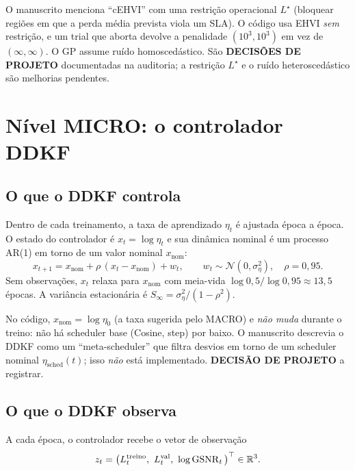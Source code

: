 \begin{observacao}
O manuscrito menciona ``cEHVI'' com uma restrição operacional $L^\star$ (bloquear regiões em que a perda média prevista viola um SLA). O código usa EHVI \emph{sem} restrição, e um trial que aborta devolve a penalidade $(10^3,10^3)$ em vez de $(\infty,\infty)$. O GP assume ruído homoscedástico. São \textbf{DECISÕES DE PROJETO} documentadas na auditoria; a restrição $L^\star$ e o ruído heteroscedástico são melhorias pendentes.
\end{observacao}

\section{Nível MICRO: o controlador DDKF}\label{sec:ddkf}

\subsection{O que o DDKF controla}
Dentro de cada treinamento, a taxa de aprendizado $\eta_t$ é ajustada época a época. O estado do controlador é $x_t=\log\eta_t$ e sua dinâmica nominal é um processo AR(1) em torno de um valor nominal $x_{\text{nom}}$:
\begin{equation}\label{eq:ar1}
x_{t+1}=x_{\text{nom}}+\rho\,(x_t-x_{\text{nom}})+w_t,\qquad w_t\sim\mathcal N(0,\sigma_\eta^2),\quad \rho=0{,}95.
\end{equation}
Sem observações, $x_t$ relaxa para $x_{\text{nom}}$ com meia-vida $\log 0{,}5/\log 0{,}95\approx13{,}5$ épocas. A variância estacionária é $S_\infty=\sigma_\eta^2/(1-\rho^2)$.

\begin{observacao}
No código, $x_{\text{nom}}=\log\eta_0$ (a taxa sugerida pelo MACRO) e \emph{não muda} durante o treino: não há scheduler base (Cosine, step) por baixo. O manuscrito descrevia o DDKF como um ``meta-scheduler'' que filtra desvios em torno de um scheduler nominal $\eta_{\text{sched}}(t)$; isso \emph{não} está implementado. \textbf{DECISÃO DE PROJETO} a registrar.
\end{observacao}

\subsection{O que o DDKF observa}
A cada época, o controlador recebe o vetor de observação
\begin{equation}\label{eq:obs}
z_t=\big(L^{\text{treino}}_t,\ L^{\text{val}}_t,\ \log\GSNR_t\big)^\top\in\R^3 .
\end{equation}


